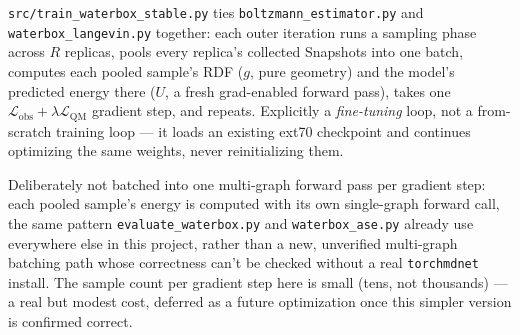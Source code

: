 \documentclass[11pt]{article}
\begin{document}
\texttt{src/train\_waterbox\_stable.py} ties \texttt{boltzmann\_estimator.py}
and \texttt{waterbox\_langevin.py} together: each outer iteration runs a
sampling phase across $R$ replicas, pools every replica's collected
Snapshots into one batch, computes each pooled sample's RDF ($g$, pure
geometry) and the model's predicted energy there ($U$, a fresh
grad-enabled forward pass), takes one $\mathcal{L}_{\text{obs}} +
\lambda\mathcal{L}_{\text{QM}}$ gradient step, and repeats. Explicitly a
\emph{fine-tuning} loop, not a from-scratch training loop --- it loads an
existing ext70 checkpoint and continues optimizing the same weights, never
reinitializing them.

Deliberately not batched into one multi-graph forward pass per gradient
step: each pooled sample's energy is computed with its own single-graph
forward call, the same pattern \texttt{evaluate\_waterbox.py} and
\texttt{waterbox\_ase.py} already use everywhere else in this project,
rather than a new, unverified multi-graph batching path whose correctness
can't be checked without a real \texttt{torchmdnet} install. The sample
count per gradient step here is small (tens, not thousands) --- a real but
modest cost, deferred as a future optimization once this simpler version
is confirmed correct.
\end{document}
